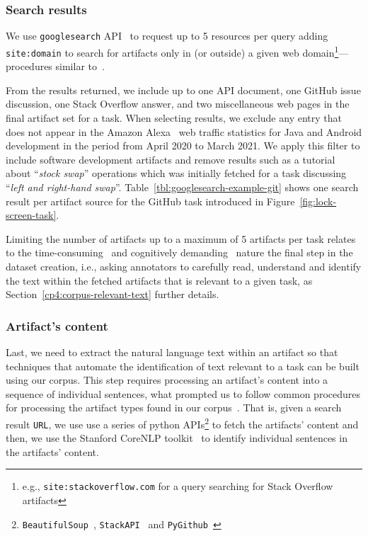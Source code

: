 \subsubsection{Search results}


We use \texttt{googlesearch} API~\cite{googlesearch} to 
request up to 5 resources per query
adding \texttt{site:domain} to search for artifacts 
only in (or outside) a given web domain\footnote{e.g., \texttt{site:stackoverflow.com} for a query searching for Stack Overflow artifacts}---procedures similar to~\cite{Xu2017}.



From the results returned, we include up to
one API document, one GitHub issue discussion, one Stack Overflow answer, and two miscellaneous web pages
in the final artifact set for a task. 
When selecting results, we exclude any entry that does not appear in the Amazon Alexa~\cite{alexa} web traffic statistics for Java and Android development in the period from April 2020 to March 2021. 
We apply this filter to include software development artifacts and remove results 
such as a tutorial about  ``\textit{stock swap}'' operations which was initially fetched 
for a task discussing ``\textit{left and right-hand swap}''.
Table~\ref{tbl:googlesearch-example-git} shows one search result per artifact source for the GitHub task introduced in Figure~\ref{fig:lock-screen-task}.


Limiting the number of artifacts up to a maximum of 5 artifacts per task relates to the
time-consuming~\cite{al2017} and cognitively demanding~\cite{Piorkowski2016} 
nature the final step in the dataset creation, i.e.,  
asking annotators to carefully read, understand and identify the text
within the fetched artifacts that is relevant to a given task,
as Section~\ref{cp4:corpus-relevant-text} further details.







\subsubsection{Artifact's content}

Last, we need to extract the natural language text within an artifact so that 
techniques that automate the identification of text relevant to a task can be built 
using our corpus.  This step requires processing an artifact's content 
into a sequence of individual sentences,
what prompted us to follow common procedures for processing the artifact types found in our corpus~\cite{Arya2019, nadi2020}.
That is, given a search result \texttt{URL}, we use use a series of python 
APIs\footnote{\texttt{BeautifulSoup}~\cite{beautifulsoup4},
\texttt{StackAPI}~\cite{StackAPI} and \texttt{PyGithub}~\cite{PyGithub}}
to fetch the artifacts' content
and then, we use the Stanford CoreNLP toolkit~\cite{CoreNLP} to identify 
individual sentences in the artifacts' content.








